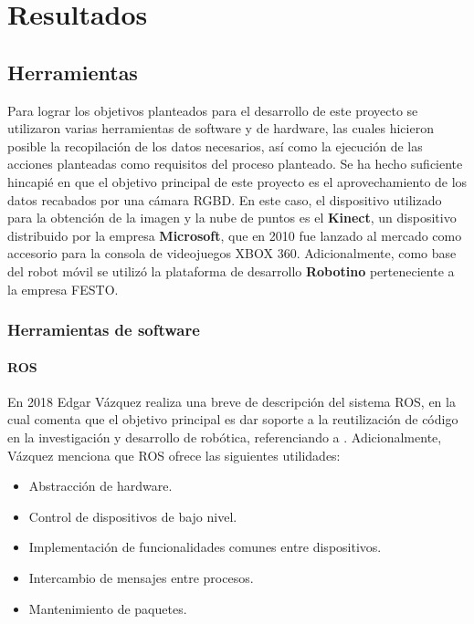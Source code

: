 \chapter{Resultados}
    \section{Herramientas}
    Para lograr los objetivos planteados para el desarrollo de este proyecto se utilizaron varias herramientas de software y de hardware, las cuales hicieron posible la recopilación de los datos necesarios, así como la ejecución de las acciones planteadas como requisitos del proceso planteado.
    Se ha hecho suficiente hincapié en que el objetivo principal de este proyecto es el aprovechamiento de los datos recabados por una cámara RGBD. En este caso, el dispositivo utilizado para la obtención de la imagen y la nube de puntos es el \textbf{Kinect}, un dispositivo distribuido por la empresa \textbf{Microsoft}, que en 2010 fue lanzado al mercado como accesorio para la consola de videojuegos XBOX 360. Adicionalmente, como base del robot móvil se utilizó la plataforma de desarrollo \textbf{Robotino} perteneciente a la empresa FESTO.

    
        \subsection{Herramientas de software}
            \subsubsection{ROS}
            En 2018 Edgar Vázquez realiza una breve de descripción del sistema ROS, en la cual comenta que el objetivo principal es dar soporte a la reutilización de código en la investigación y desarrollo de robótica, referenciando a \cite{quigley_ROS}. Adicionalmente, Vázquez menciona que ROS ofrece las siguientes utilidades:
            \begin{itemize}
                \item Abstracción de hardware.
                \item Control de dispositivos de bajo nivel.
                \item Implementación de funcionalidades comunes entre dispositivos.
                \item Intercambio de mensajes entre procesos.
                \item Mantenimiento de paquetes.
            \end{itemize}


